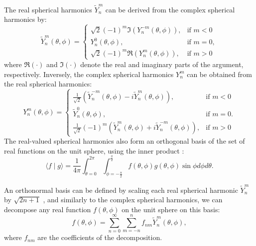 The real spherical harmonics $\tilde{Y}_n^m$ can be derived from the complex spherical harmonics by:
\begin{equation}
    \tilde{Y}_n^m(\theta,\phi) = 
    \begin{cases}
        \sqrt{2} (-1)^m \mathfrak{I} (Y_n^{-m}(\theta,\phi)), & \text{if $m<0$} \\
        Y_n^0(\theta,\phi), & \text{if $m=0$}, \\
        \sqrt{2} (-1)^m \mathfrak{R} (Y_n^m(\theta,\phi)), & \text{if $m>0$}
    \end{cases}
\end{equation}
where $\mathfrak{R}(\cdot)$ and $\mathfrak{I}(\cdot)$ denote the real and imaginary parts of the argument, respectively.
Inversely, the complex spherical harmonics $Y_n^m$ can be obtained from the real spherical harmonics:
\begin{equation}
\label{eq:real2complex}
    Y_n^m(\theta,\phi) = 
    \begin{cases}
        \frac{1}{\sqrt{2}} (\tilde{Y}_n^{-m}(\theta,\phi) - i \tilde{Y}_n^m(\theta,\phi)), & \text{if $m<0$} \\
        \tilde{Y}_n^0(\theta,\phi), & \text{if $m=0$}. \\
        \frac{1}{\sqrt{2}} (-1)^m (\tilde{Y}_n^m(\theta,\phi) + i \tilde{Y}_n^{-m}(\theta,\phi)), & \text{if $m>0$}
    \end{cases}
\end{equation}
The real-valued spherical harmonics also form an orthogonal basis of the set of real functions on the unit sphere, using the inner product \cite[p.~302]{daniel_representation_2001}:
\begin{equation}
    \langle f \mid g \rangle = \frac{1}{4 \pi} \int_{\theta=0}^{2 \pi} \int_{\phi=-\frac{\pi}{2}}^{\frac{\pi}{2}} f(\theta,\phi) g(\theta,\phi) \sin \phi d \phi d \theta.
\end{equation}

An orthonormal basis can be defined by scaling each real spherical harmonic $\tilde{Y}_n^m$ by $\sqrt{2n+1}$ \cite{daniel_representation_2001}, and similarly to the complex spherical harmonics, we can decompose any real function $f(\theta,\phi)$ on the unit sphere on this basis:
\begin{equation}\label{eqHOArealDecomp}
    f(\theta,\phi) = \sum_{n=0}^\infty \sum_{m=-n}^{n} f_{nm} \tilde{Y}_n^m(\theta,\phi),
\end{equation}
where $f_{nm}$ are the coefficients of the decomposition.

